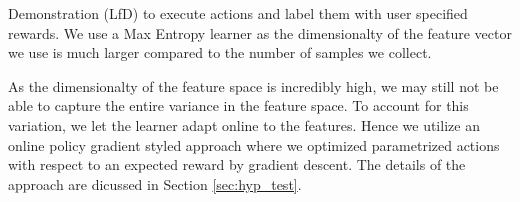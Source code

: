 Demonstration (LfD) to execute actions and label them with user specified rewards. We use a Max Entropy learner as the dimensionalty of the feature vector we use is much larger compared to the number of samples we collect.

As the dimensionalty of the feature space is incredibly high, we may still not be able to capture the entire variance in the feature space. To account for this variation, we let the learner adapt online to the features. Hence we utilize an online policy gradient styled approach where we optimized parametrized actions with respect to an expected reward by gradient descent. The details of the approach are dicussed in Section \ref{sec:hyp_test}.



% 
% 

